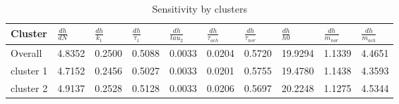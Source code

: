 \documentclass[fleqn,10pt]{wlscirep}
\begin{document}
\begin{table}[]
\centering
\caption{Sensitivity by clusters}
\label{tab:clusterSensitivity}
\begin{tabular}{|l|l|l|l|l|l|l|l|l|l|}
\hline
Cluster   & $\frac{dh}{dN}$ & $\frac{dh}{k_1}$ & $\frac{dh}{\tau_1}$ & $\frac{dh}{tau_2}$ & $\frac{dh}{\tau_{ach}}$ & $\frac{dh}{\tau_{nor}}$ & $\frac{dh}{h0}$ & $\frac{dh}{m_{nor}}$ & $\frac{dh}{m_{ach}}$ \\ \hline
Overall   & 4.8352          & 0.2500           & 0.5088              & 0.0033             & 0.0204                  & 0.5720                  & 19.9294         & 1.1339               & 4.4651               \\ \hline
cluster 1 & 4.7152          & 0.2456           & 0.5027              & 0.0033             & 0.0201                  & 0.5755                  & 19.4780         & 1.1438               & 4.3593               \\ \hline
cluster 2 & 4.9137          & 0.2528           & 0.5128              & 0.0033             & 0.0206                  & 0.5697                  & 20.2248         & 1.1275               & 4.5344               \\ \hline
\end{tabular}
\end{table}
\end{document}

